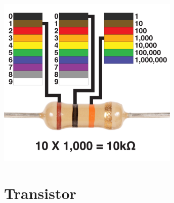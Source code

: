 \documentclass[a4paper]{article}
\begin{document}
\begin{center}
    \includegraphics[width=0.65\textwidth]{images/couleur-resistance.jpg}
\end{center}















\section{Transistor}
\end{document}
